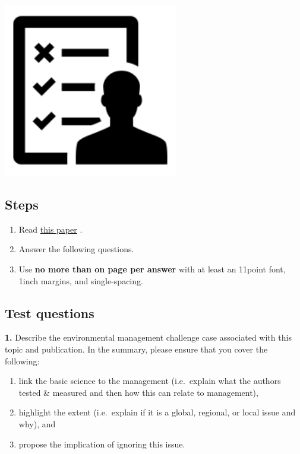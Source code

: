 \documentclass[
]{book}
\providecommand{\tightlist}{%
  \setlength{\itemsep}{0pt}\setlength{\parskip}{0pt}}
\begin{document}
\includegraphics[width=3in,height=\textheight]{./test.png}

\hypertarget{steps-1}{%
\subsection*{Steps}\label{steps-1}}

\begin{enumerate}
\def\labelenumi{\arabic{enumi}.}
\tightlist
\item
  Read \href{https://www.facetsjournal.com/doi/full/10.1139/facets-2020-0108}{this paper} \citep{RN7311}.
\item
  Answer the following questions.
\item
  Use \textbf{no more than on page per answer} with at least an 11point font, 1inch margins, and single-spacing.
\end{enumerate}

\hypertarget{test-questions}{%
\subsection*{Test questions}\label{test-questions}}

\textbf{1.} Describe the environmental management challenge case associated with this topic and publication. In the summary, please ensure that you cover the following:

\begin{enumerate}
\def\labelenumi{(\alph{enumi})}
\tightlist
\item
  link the basic science to the management (i.e.~explain what the authors tested \& measured and then how this can relate to management),\\
\item
  highlight the extent (i.e.~explain if it is a global, regional, or local issue and why), and\\
\item
  propose the implication of ignoring this issue.
\end{enumerate}
\end{document}

